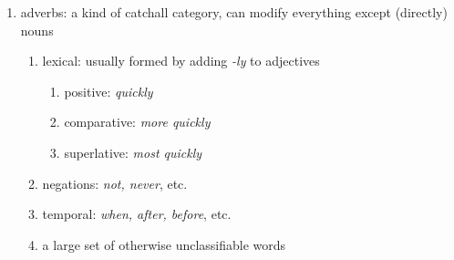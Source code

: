 \documentclass[12pt]{article}
\begin{document}
\begin{enumerate}
    \begin{enumerate}
    \setcounter{enumii}{1}
    \item lexical: defines a particular property, has three degrees;
        \begin{enumerate}
        \item positive: \textit{cool/good/puke-like}
        \item comparative: \textit{cooler/better/more puke-like}
        \item superlative: \textit{coolest/best/most puke-like}
        \end{enumerate}
    \item possessive: indicates possession (distinct from the possessive personal pronouns (above))
        \begin{enumerate}
        \item \textit{my, your, his/her/its, our, your, their}
        \end{enumerate}
    \item relative: refers to a prior antecedent and modifies a noun in its own clause;
        \begin{enumerate}
        \item \textit{what, which}
        \end{enumerate}
    \item interrogative: used to form a question and modifies a noun
        \begin{enumerate}
        \item \textit{what, which}
        \end{enumerate}
    \item demonstrative: marks out a particular noun, identical to the demonstrative pronouns (above)
    \end{enumerate}
\setcounter{enumi}{1}
\item adverbs: a kind of catchall category, can modify everything except (directly) nouns
    \begin{enumerate}
    \item lexical: usually formed by adding \textit{-ly} to adjectives
        \begin{enumerate}
        \item positive: \textit{quickly}
        \item comparative: \textit{more quickly}
        \item superlative: \textit{most quickly}
        \end{enumerate}
    \item negations: \textit{not, never}, etc.
    \item temporal: \textit{when, after, before}, etc.
    \item a large set of otherwise unclassifiable words
    \end{enumerate}
\end{enumerate}
\end{document}

